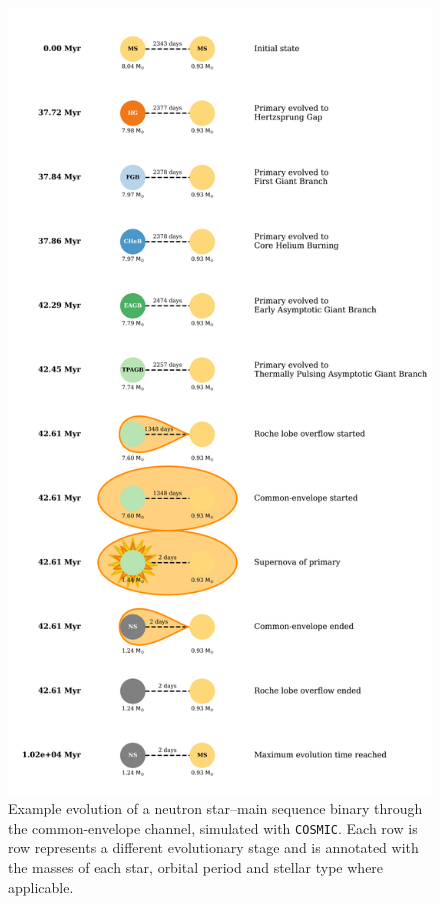 \documentclass[twocolumn, twocolappendix]{aastex631}
\newcommand{\cosmic}{\texttt{COSMIC}\xspace}
\begin{document}
\begin{figure}
    \centering
    \includegraphics[width=\columnwidth]{figures/cartoon.png}
    \caption{Example evolution of a neutron star--main sequence binary through the common-envelope channel, simulated with \cosmic. Each row is row represents a different evolutionary stage and is annotated with the masses of each star, orbital period and stellar type where applicable.}
    \label{fig:cartoon_ms_ns}
\end{figure}
\end{document}
